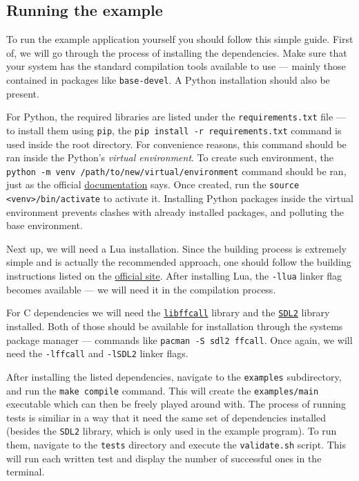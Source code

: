 \documentclass[polish, english]{iithesis}
\begin{document}
    \subsection{Running the example}
      To run the example application yourself you should follow this simple guide.
      First of, we will go through the process of installing the dependencies.
      Make sure that your system has the standard compilation tools available to use --- mainly those contained in packages like \texttt{base-devel}.
      A Python installation should also be present.

      For Python, the required libraries are listed under the \texttt{requirements.txt} file --- to install them using \texttt{pip}, the \texttt{pip install -r requirements.txt} command is used inside the root directory.
      For convenience reasons, this command should be ran inside the Python's \textit{virtual environment}.
      To create such environment, the \texttt{python -m venv /path/to/new/virtual/environment} command should be ran, just as the official \href{https://docs.python.org/3/library/venv.html}{documentation} says.
      Once created, run the \texttt{source <venv>/bin/activate} to activate it.
      Installing Python packages inside the virtual environment prevents clashes with already installed packages, and polluting the base environment.

      Next up, we will need a Lua installation.
      Since the building process is extremely simple and is actually the recommended approach, one should follow the building instructions listed on the \href{https://www.lua.org/download.html}{official site}.
      After installing Lua, the \texttt{-llua} linker flag becomes available --- we will need it in the compilation process.

      For C dependencies we will need the \href{https://www.gnu.org/software/libffcall/}{\texttt{libffcall}} library and the \href{https://www.libsdl.org/}{\texttt{SDL2}} library installed.
      Both of those should be available for installation through the systems package manager --- commands like \texttt{pacman -S sdl2 ffcall}.
      Once again, we will need the \texttt{-lffcall} and \texttt{-lSDL2} linker flags.
      
      After installing the listed dependencies, navigate to the \texttt{examples} subdirectory, and run the \texttt{make compile} command.
      This will create the \texttt{examples/main} executable which can then be freely played around with.
      The process of running tests is similiar in a way that it need the same set of dependencies installed (besides the \texttt{SDL2} library, which is only used in the example program).
      To run them, navigate to the \texttt{tests} directory and execute the \texttt{validate.sh} script.
      This will run each written test and display the number of successful ones in the terminal.
\end{document}
